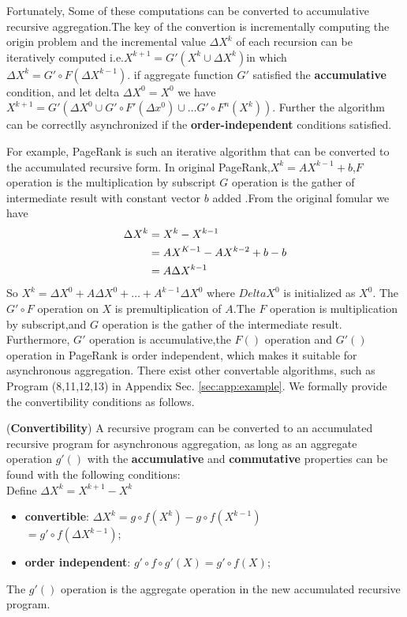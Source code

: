 Fortunately, Some of these computations can be converted to accumulative recursive aggregation.The key of the convertion is incrementally computing the origin problem and the incremental value $\Delta X^k$ of each recursion can be iteratively computed i.e.$X^{k+1}=G'(X^{k}\cup \Delta X^{k})$in which $\Delta X^{k} =G' \circ F(\Delta X^{k-1})$.
if aggregate function $G'$ satisfied the \textbf{accumulative} condition,
and let delta $\Delta X^0=X^0$ we have $X^{k+1}=G'(\Delta X^0 \cup G'\circ F'(\Delta x^0)\cup \ldots G' \circ F^n(X^k))$. Further the algorithm can be correctlly asynchronized if the \textbf{order-independent} conditions satisfied. 

For example, PageRank is such an iterative algorithm that can be converted to the accumulated recursive form. %
In original PageRank,$X^k=AX^{k-1}+b$,$F$ operation is the multiplication by subscript $G$ operation is the gather of intermediate result with constant vector $b$ added .From the original fomular we have
\begin{equation}
\begin{aligned}
\Delta X^k&=X^k-X^{k-1} \notag\\&=AX^{K-1}-AX^{k-2}+b-b\notag\\&=A\Delta X^{k-1}\notag
\end{aligned}
\end{equation}
So $X^k=\Delta X^0+A\Delta X^0+\ldots+A^{k-1}\Delta X^0$
where $Delta X^0$ is initialized as $X^0$. The $G'\circ F$ operation on $X$ is premultiplication of $A$.The $F$ operation is multiplication by subscript,and $G$ operation is the gather of the intermediate result. 
Furthermore, $G'$ operation is accumulative,the $F()$ operation and $G'()$ operation in PageRank is order independent, which makes it suitable for asynchronous aggregation. There exist other convertable algorithms, such as Program (8,11,12,13) in Appendix Sec. \ref{sec:app:example}.
We formally provide the convertibility conditions as follows.

\begin{theorem}
	\label{th:convert}
	(\textbf{Convertibility}) A recursive program can be converted to an accumulated recursive program for asynchronous aggregation, as long as an aggregate operation $g'()$ with the \textbf{accumulative} and \textbf{commutative} properties can be found with the following conditions:\\
	Define $\Delta X^k=X^{k+1}-X^k$
	\begin{itemize}
		\item \textbf{convertible}: $\Delta X^k=g\circ f(X^k)-g\circ f(X^{k-1})$\\						
						$         =g'\circ f(\Delta X^{k-1})$;
\item \textbf{order independent}: $g'\circ f\circ g'(X)=g'\circ f(X)$;
	\end{itemize}
	 The $g'()$ operation is the aggregate operation in the new accumulated recursive program.
\end{theorem}

